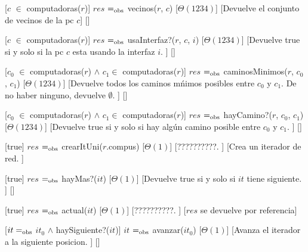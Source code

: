 \begin{Interfaz}
  [$c$ $\in$ computadoras($r$)]%
  {$res$ $=_{\mathrm{obs}}$ vecinos($r$, $c$)}%
  [$\Theta(1234)$]%
  [Devuelve el conjunto de vecinos de la pc $c$]%
  []%
  
  [$c$ $\in$ computadoras($r$)]%
  {$res$ $=_{\mathrm{obs}}$ usaInterfaz?($r$, $c$, $i$)}%
  [$\Theta(1234)$]%
  [Devuelve true si y solo si la pc $c$ esta usando la interfaz $i$. ]%
  []%
  
  [$c_{0}$ $\in$ computadoras($r$) $\land$ $c_{1} \in $ computadoras($r$)]%
  {$res$ $=_{\mathrm{obs}}$ caminosMinimos($r$, $c_{0}$, $c_{1}$)}%
  [$\Theta(1234)$]%
  [Devuelve todos los caminos m\'nimos posibles entre $c_{0}$ y $c_{1}$. De no haber ninguno, devuelve $\emptyset$. ]%
  []%
  
  [$c_{0}$ $\in$ computadoras($r$) $\land$ $c_{1} \in $ computadoras($r$)]%
  {$res$ $=_{\mathrm{obs}}$ hayCamino?($r$, $c_{0}$, $c_{1}$)}%
  [$\Theta(1234)$]%
  [Devuelve true si y solo si hay alg\'un camino posible entre $c_{0}$ y $c_{1}$. ]%
  []%


  [true]%
  {$res$ $=_{\mathrm{obs}}$ crearItUni($r$.compus)}%
  [$\Theta(1)$]%
  [??????????. ]%
  [Crea un iterador de red. ]%

  [true]%
  {$res$ $=_{\mathrm{obs}}$ hayMas?($it$)}%
  [$\Theta(1)$]%
  [Devuelve true si y solo si $it$ tiene siguiente. ]%
  []%

  [true]%
  {$res$ $=_{\mathrm{obs}}$ actual($it$)}%
  [$\Theta(1)$]%
  [??????????. ]%
  [$res$ se devuelve por referencia]%

  [$it =_{\mathrm{obs}}$ $it_{0}$ $\land$ haySiguiente?($it$)]%
  {$it$ $=_{\mathrm{obs}}$ avanzar($it_{0}$)}%
  [$\Theta(1)$]%
  [Avanza el iterador a la siguiente posicion. ]%
  []%

\end{Interfaz}

